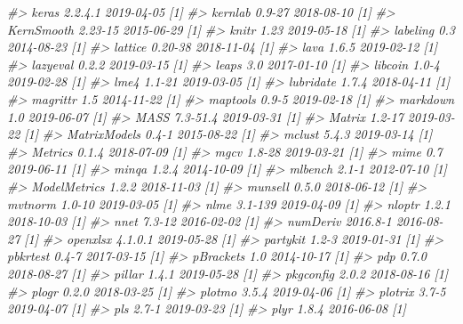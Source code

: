 \documentclass[]{krantz}
\makeatletter
\newenvironment{Shaded}{\begin{snugshade}}{\end{snugshade}}
\newcommand{\CommentTok}[1]{\textcolor[rgb]{0.37,0.37,0.37}{\textit{#1}}}
\newenvironment{kframe}{%
\medskip{}
\setlength{\fboxsep}{.8em}
 \def\at@end@of@kframe{}%
 \ifinner\ifhmode%
  \def\at@end@of@kframe{\end{minipage}}%
  \begin{minipage}{\columnwidth}%
 \fi\fi%
 \def\FrameCommand##1{\hskip\@totalleftmargin \hskip-\fboxsep
 \colorbox{shadecolor}{##1}\hskip-\fboxsep
     \hskip-\linewidth \hskip-\@totalleftmargin \hskip\columnwidth}%
 \MakeFramed {\advance\hsize-\width
   \@totalleftmargin\z@ \linewidth\hsize
   \@setminipage}}%
 {\par\unskip\endMakeFramed%
 \at@end@of@kframe}
\renewenvironment{Shaded}{\begin{kframe}}{\end{kframe}}
\makeatother
\begin{document}
\begin{Shaded}
\begin{Highlighting}[]
\CommentTok{#>    keras           2.2.4.1    2019-04-05 [1]}
\CommentTok{#>    kernlab         0.9-27     2018-08-10 [1]}
\CommentTok{#>    KernSmooth      2.23-15    2015-06-29 [1]}
\CommentTok{#>    knitr           1.23       2019-05-18 [1]}
\CommentTok{#>    labeling        0.3        2014-08-23 [1]}
\CommentTok{#>    lattice         0.20-38    2018-11-04 [1]}
\CommentTok{#>    lava            1.6.5      2019-02-12 [1]}
\CommentTok{#>    lazyeval        0.2.2      2019-03-15 [1]}
\CommentTok{#>    leaps           3.0        2017-01-10 [1]}
\CommentTok{#>    libcoin         1.0-4      2019-02-28 [1]}
\CommentTok{#>    lme4            1.1-21     2019-03-05 [1]}
\CommentTok{#>    lubridate       1.7.4      2018-04-11 [1]}
\CommentTok{#>    magrittr        1.5        2014-11-22 [1]}
\CommentTok{#>    maptools        0.9-5      2019-02-18 [1]}
\CommentTok{#>    markdown        1.0        2019-06-07 [1]}
\CommentTok{#>    MASS            7.3-51.4   2019-03-31 [1]}
\CommentTok{#>    Matrix          1.2-17     2019-03-22 [1]}
\CommentTok{#>    MatrixModels    0.4-1      2015-08-22 [1]}
\CommentTok{#>    mclust          5.4.3      2019-03-14 [1]}
\CommentTok{#>    Metrics         0.1.4      2018-07-09 [1]}
\CommentTok{#>    mgcv            1.8-28     2019-03-21 [1]}
\CommentTok{#>    mime            0.7        2019-06-11 [1]}
\CommentTok{#>    minqa           1.2.4      2014-10-09 [1]}
\CommentTok{#>    mlbench         2.1-1      2012-07-10 [1]}
\CommentTok{#>    ModelMetrics    1.2.2      2018-11-03 [1]}
\CommentTok{#>    munsell         0.5.0      2018-06-12 [1]}
\CommentTok{#>    mvtnorm         1.0-10     2019-03-05 [1]}
\CommentTok{#>    nlme            3.1-139    2019-04-09 [1]}
\CommentTok{#>    nloptr          1.2.1      2018-10-03 [1]}
\CommentTok{#>    nnet            7.3-12     2016-02-02 [1]}
\CommentTok{#>    numDeriv        2016.8-1   2016-08-27 [1]}
\CommentTok{#>    openxlsx        4.1.0.1    2019-05-28 [1]}
\CommentTok{#>    partykit        1.2-3      2019-01-31 [1]}
\CommentTok{#>    pbkrtest        0.4-7      2017-03-15 [1]}
\CommentTok{#>    pBrackets       1.0        2014-10-17 [1]}
\CommentTok{#>    pdp             0.7.0      2018-08-27 [1]}
\CommentTok{#>    pillar          1.4.1      2019-05-28 [1]}
\CommentTok{#>    pkgconfig       2.0.2      2018-08-16 [1]}
\CommentTok{#>    plogr           0.2.0      2018-03-25 [1]}
\CommentTok{#>    plotmo          3.5.4      2019-04-06 [1]}
\CommentTok{#>    plotrix         3.7-5      2019-04-07 [1]}
\CommentTok{#>    pls             2.7-1      2019-03-23 [1]}
\CommentTok{#>    plyr            1.8.4      2016-06-08 [1]}

\end{Highlighting}
\end{Shaded}
\end{document}
